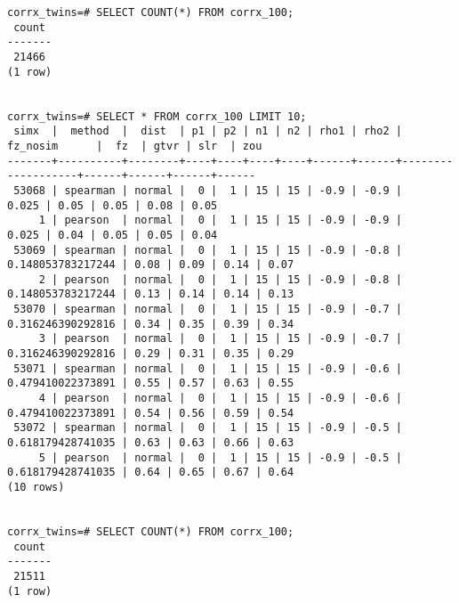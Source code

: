 \begin{lstlisting}[float=h,caption={Example inspection of simulation results in database, while parallel processing is occurring.},label={lst:corrx_sql}]
corrx_twins=# SELECT COUNT(*) FROM corrx_100;
 count
-------
 21466
(1 row)


corrx_twins=# SELECT * FROM corrx_100 LIMIT 10;
 simx  |  method  |  dist  | p1 | p2 | n1 | n2 | rho1 | rho2 |     fz_nosim      |  fz  | gtvr | slr  | zou
-------+----------+--------+----+----+----+----+------+------+-------------------+------+------+------+------
 53068 | spearman | normal |  0 |  1 | 15 | 15 | -0.9 | -0.9 |             0.025 | 0.05 | 0.05 | 0.08 | 0.05
     1 | pearson  | normal |  0 |  1 | 15 | 15 | -0.9 | -0.9 |             0.025 | 0.04 | 0.05 | 0.05 | 0.04
 53069 | spearman | normal |  0 |  1 | 15 | 15 | -0.9 | -0.8 | 0.148053783217244 | 0.08 | 0.09 | 0.14 | 0.07
     2 | pearson  | normal |  0 |  1 | 15 | 15 | -0.9 | -0.8 | 0.148053783217244 | 0.13 | 0.14 | 0.14 | 0.13
 53070 | spearman | normal |  0 |  1 | 15 | 15 | -0.9 | -0.7 | 0.316246390292816 | 0.34 | 0.35 | 0.39 | 0.34
     3 | pearson  | normal |  0 |  1 | 15 | 15 | -0.9 | -0.7 | 0.316246390292816 | 0.29 | 0.31 | 0.35 | 0.29
 53071 | spearman | normal |  0 |  1 | 15 | 15 | -0.9 | -0.6 | 0.479410022373891 | 0.55 | 0.57 | 0.63 | 0.55
     4 | pearson  | normal |  0 |  1 | 15 | 15 | -0.9 | -0.6 | 0.479410022373891 | 0.54 | 0.56 | 0.59 | 0.54
 53072 | spearman | normal |  0 |  1 | 15 | 15 | -0.9 | -0.5 | 0.618179428741035 | 0.63 | 0.63 | 0.66 | 0.63
     5 | pearson  | normal |  0 |  1 | 15 | 15 | -0.9 | -0.5 | 0.618179428741035 | 0.64 | 0.65 | 0.67 | 0.64
(10 rows)


corrx_twins=# SELECT COUNT(*) FROM corrx_100;
 count
-------
 21511
(1 row)

\end{lstlisting}
